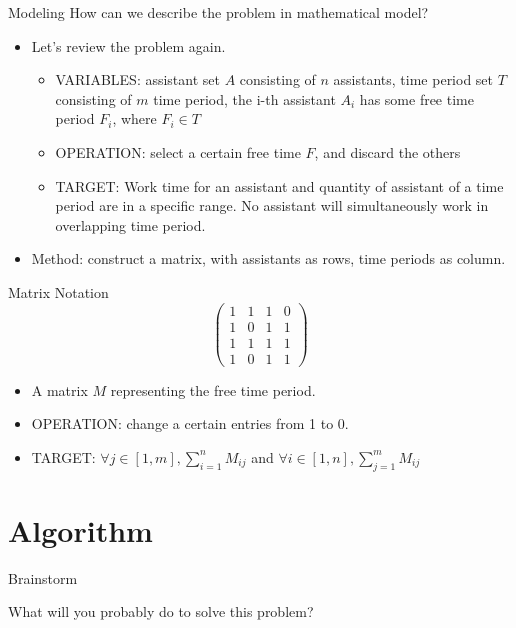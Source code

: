 \begin{frame}[t]{Modeling}
  How can we describe the problem in mathematical model?
  \begin{itemize}[<+->]
    \item Let's review the problem again.
      \begin{itemize}
        \item VARIABLES: assistant set $A$ consisting of $n$ assistants, time
          period set $T$ consisting of $m$ time period, the i-th assistant $A_i$
          has some free time period $F_i$, where $F_i \in T$
        \item OPERATION: select a certain free time $F$, and discard the
          others
        \item TARGET: Work time for an assistant and quantity of assistant of a
          time period are in a specific range. No assistant will simultaneously
          work in overlapping time period.
      \end{itemize}
    \item Method: construct a matrix, with assistants as rows, time periods as
      column.

  \end{itemize}
\end{frame}

\begin{frame}[t]{Matrix Notation}
$$\begin{pmatrix}
  1& 1& 1& 0\\
  1& 0& 1& 1\\
  1& 1& 1& 1\\
  1& 0& 1& 1
  \end{pmatrix}$$
  \begin{itemize}
    \item A matrix $M$ representing the free time period.
    \item OPERATION: change a certain entries from 1 to 0.
    \item TARGET: $\forall j \in [1, m], \sum_{i=1}^nM_{ij}$ and $\forall i \in
      [1, n], \sum_{j=1}^mM_{ij}$
  \end{itemize}
\end{frame}

\section{Algorithm}
\begin{frame}[t]{Brainstorm}
  \begin{center}
  \huge{What will you probably do to solve this problem?}
  \end{center}
\end{frame}

